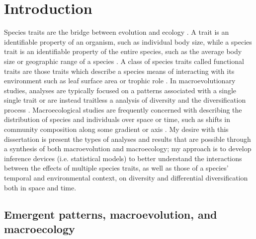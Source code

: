 \chapter{Introduction} \label{ch:intro}


Species traits are the bridge between evolution and ecology \citep{Mcgill2006,Weber2017}. A trait is an identifiable property of an organism, such as individual body size, while a species trait is an identifiable property of the entire species, such as the average body size or geographic range of a species \citep{Mcgill2006}. A class of species traits called functional traits are those traits which describe a species means of interacting with its environment such as leaf surface area or trophic role \citep{Mcgill2006}. In macroevolutionary studies, analyses are typically focused on a patterns associated with a single single trait or are instead traitless a analysis of diversity and the diversification process \citep{Silvestro2014a,Silvestro2015b,Pires2015a,Rabosky2013,Slater2015c,Hunt2007a,Hunt2006a,Liow2008,Payne2007}. Macroecological studies are frequently concerned with describing the distribution of species and individuals over space or time, such as shifts in community composition along some gradient or axis \citep{Smith2008b,Smith2004,Brown1995,Brown1989,Bush2007,Eronen2009,Fortelius2002,Jernvall2002,Jernvall2004}. My desire with this dissertation is present the types of analyses and results that are possible through a synthesis of both macroevolution and macroecology; my approach is to develop inference devices (i.e. statistical models) to better understand the interactions between the effects of multiple species traits, as well as those of a species' temporal and environmental context, on diversity and differential diversification both in space and time.


\section{Emergent patterns, macroevolution, and macroecology}

